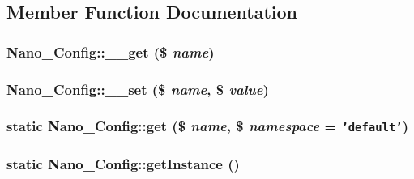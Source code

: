\subsection{Member Function Documentation}
\hypertarget{classNano__Config_f231df8e3498c7a3a4ef241bebe2a6ff}{
\subsubsection[{\_\-\_\-get}]{\setlength{\rightskip}{0pt plus 5cm}Nano\_\-Config::\_\-\_\-get (\$ {\em name})}}
\label{classNano__Config_f231df8e3498c7a3a4ef241bebe2a6ff}


\hypertarget{classNano__Config_4f62ccee4fa70aae58ac8aaab3797450}{
\subsubsection[{\_\-\_\-set}]{\setlength{\rightskip}{0pt plus 5cm}Nano\_\-Config::\_\-\_\-set (\$ {\em name}, \/  \$ {\em value})}}
\label{classNano__Config_4f62ccee4fa70aae58ac8aaab3797450}


\hypertarget{classNano__Config_ba68e7083da2ef2e7437bddef42f6deb}{
\subsubsection[{get}]{\setlength{\rightskip}{0pt plus 5cm}static Nano\_\-Config::get (\$ {\em name}, \/  \$ {\em namespace} = {\tt 'default'})}}
\label{classNano__Config_ba68e7083da2ef2e7437bddef42f6deb}


\hypertarget{classNano__Config_d9856effe206bf69ac033daca3384abc}{
\subsubsection[{getInstance}]{\setlength{\rightskip}{0pt plus 5cm}static Nano\_\-Config::getInstance ()}}
\label{classNano__Config_d9856effe206bf69ac033daca3384abc}


